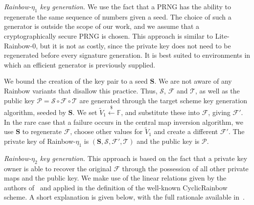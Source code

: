 \documentclass[openright, draft, 10pt]{report}
\newcommand{\random}{\stackrel{\$}{\longleftarrow}}
\begin{document}
\emph{Rainbow-$\eta_{1}$ key generation.}
We use the fact that a PRNG has the ability to regenerate the same sequence of
numbers given a seed. The choice of such a generator is outside the scope of
our work, and we assume that a cryptographically secure PRNG is chosen. This
approach is similar to Lite-Rainbow-0, but it is not as costly, since the
private key does not need to be regenerated before every signature generation.
It is best suited to environments in which an efficient generator is previously
supplied.

We bound the creation of the key pair to a seed $\mathbf{S}$. We are not aware
of any Rainbow variants that disallow this practice. Thus, $\mathcal{S}$,
$\mathcal{F}$ and $\mathcal{T}$, as well as the public key
$\mathcal{P} = \mathcal{S} \circ \mathcal{F} \circ \mathcal{T}$ are generated
through the target scheme key generation algorithm, seeded by $\mathbf{S}$. We
set $\widetilde{V}_{1} \random{} \mathbb{F}$, and substitute these into
$\mathcal{F}$, giving $\mathcal{F}'$. In the rare case that a
failure occurs in the central map inversion algorithm, we use $\mathbf{S}$ to
regenerate $\mathcal{F}$, choose other values for $\widetilde{V}_{1}$ and
create a different $\mathcal{F}'$. The private key of Rainbow-$\eta_{1}$ is
$(\mathbf{S}, \mathcal{S}, \mathcal{F}', \mathcal{T})$ and the public key is
$\mathcal{P}$.

\emph{Rainbow-$\eta_{2}$ key generation.}
This approach is based on the fact that a private key owner is able to recover
the original $\mathcal{F}$ through the possession of all other private maps and
the public key. We make use of the linear relations given by the authors
of~\cite{Petzoldt:201006:inproc} and applied in the definition of the
well-known CyclicRainbow scheme. A short explanation is given below, with the
full rationale available in~\cite[Chapter 7]{Petzoldt:201307:phd}.
\end{document}
